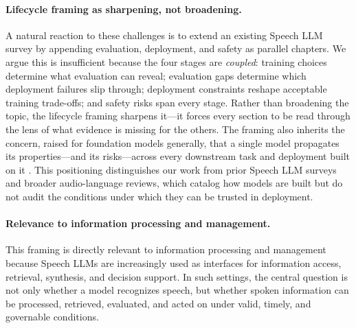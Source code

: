 \paragraph{Lifecycle framing as sharpening, not broadening.}
A natural reaction to these challenges is to extend an existing Speech
LLM survey by appending evaluation, deployment, and safety as parallel
chapters. We argue this is insufficient because the four stages are
\emph{coupled}: training choices determine what evaluation can reveal;
evaluation gaps determine which deployment failures slip through;
deployment constraints reshape acceptable training trade-offs; and
safety risks span every stage. Rather than broadening the topic, the
lifecycle framing sharpens it---it forces every section to be read
through the lens of what evidence is missing for the others. The framing
also inherits the concern, raised for foundation models generally, that a
single model propagates its properties---and its risks---across every
downstream task and deployment built on it \citep{bommasani2021foundation}.
This positioning distinguishes our work from prior Speech LLM surveys
\citep{cui2024recent,peng2025surveyspeechlargelanguage} and broader
audio-language reviews, which catalog how models are built but do not
audit the conditions under which they can be trusted in deployment.

\paragraph{Relevance to information processing and management.}
This framing is directly relevant to information processing and
management because Speech LLMs are increasingly used as interfaces for
information access, retrieval, synthesis, and decision support. In
such settings, the central question is not only whether a model
recognizes speech, but whether spoken information can be processed,
retrieved, evaluated, and acted on under valid, timely, and governable
conditions.

